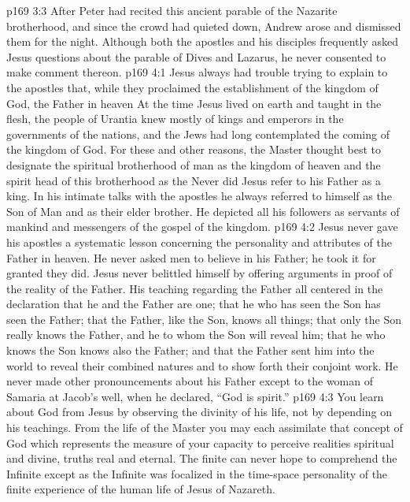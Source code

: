 \vs p169 3:3 After Peter had recited this ancient parable of the Nazarite brotherhood, and since the crowd had quieted down, Andrew arose and dismissed them for the night. Although both the apostles and his disciples frequently asked Jesus questions about the parable of Dives and Lazarus, he never consented to make comment thereon.
\vs p169 4:1 Jesus always had trouble trying to explain to the apostles that, while they proclaimed the establishment of the kingdom of God, the Father in heaven  At the time Jesus lived on earth and taught in the flesh, the people of Urantia knew mostly of kings and emperors in the governments of the nations, and the Jews had long contemplated the coming of the kingdom of God. For these and other reasons, the Master thought best to designate the spiritual brotherhood of man as the kingdom of heaven and the spirit head of this brotherhood as the  Never did Jesus refer to his Father as a king. In his intimate talks with the apostles he always referred to himself as the Son of Man and as their elder brother. He depicted all his followers as servants of mankind and messengers of the gospel of the kingdom.
\vs p169 4:2 Jesus never gave his apostles a systematic lesson concerning the personality and attributes of the Father in heaven. He never asked men to believe in his Father; he took it for granted they did. Jesus never belittled himself by offering arguments in proof of the reality of the Father. His teaching regarding the Father all centered in the declaration that he and the Father are one; that he who has seen the Son has seen the Father; that the Father, like the Son, knows all things; that only the Son really knows the Father, and he to whom the Son will reveal him; that he who knows the Son knows also the Father; and that the Father sent him into the world to reveal their combined natures and to show forth their conjoint work. He never made other pronouncements about his Father except to the woman of Samaria at Jacob’s well, when he declared, \textcolor{ubdarkred}{“God is spirit.”}
\vs p169 4:3 \pc You learn about God from Jesus by observing the divinity of his life, not by depending on his teachings. From the life of the Master you may each assimilate that concept of God which represents the measure of your capacity to perceive realities spiritual and divine, truths real and eternal. The finite can never hope to comprehend the Infinite except as the Infinite was focalized in the time\hyp{}space personality of the finite experience of the human life of Jesus of Nazareth.

